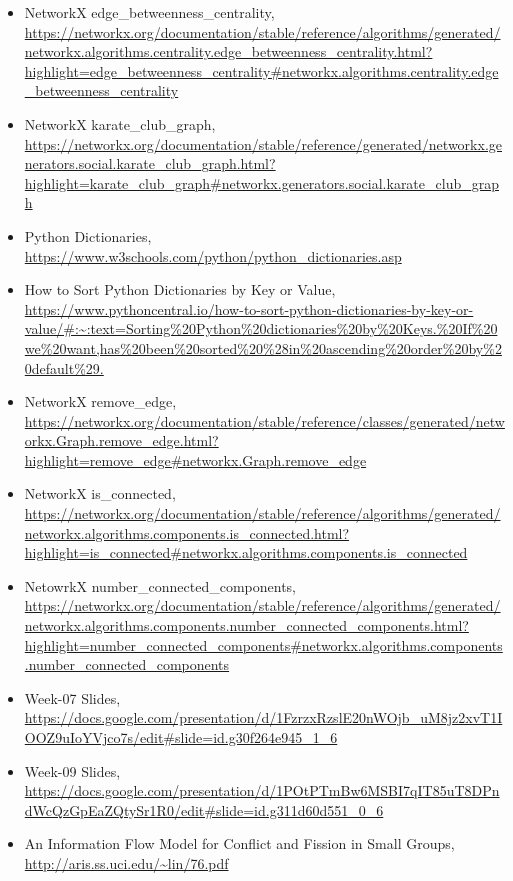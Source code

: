 \documentclass[12pt]{article}
\begin{document}
\begin{itemize}
    \item {NetworkX edge\_betweenness\_centrality, \url{https://networkx.org/documentation/stable/reference/algorithms/generated/networkx.algorithms.centrality.edge\_betweenness\_centrality.html?highlight=edge\_betweenness\_centrality#networkx.algorithms.centrality.edge\_betweenness\_centrality}}
    \item {NetworkX karate\_club\_graph, \url{https://networkx.org/documentation/stable/reference/generated/networkx.generators.social.karate\_club\_graph.html?highlight=karate\_club\_graph#networkx.generators.social.karate\_club\_graph}}
    \item {Python Dictionaries, \url{https://www.w3schools.com/python/python_dictionaries.asp}}
    \item {How to Sort Python Dictionaries by Key or Value, \url{https://www.pythoncentral.io/how-to-sort-python-dictionaries-by-key-or-value/#:~:text=Sorting\%20Python\%20dictionaries\%20by\%20Keys.\%20If\%20we\%20want,has\%20been\%20sorted\%20\%28in\%20ascending\%20order\%20by\%20default\%29.}}
    \item {NetworkX remove\_edge, \url{https://networkx.org/documentation/stable/reference/classes/generated/networkx.Graph.remove\_edge.html?highlight=remove\_edge#networkx.Graph.remove\_edge}}
    \item {NetworkX is\_connected, \url{https://networkx.org/documentation/stable/reference/algorithms/generated/networkx.algorithms.components.is\_connected.html?highlight=is\_connected#networkx.algorithms.components.is\_connected}}
    \item {NetowrkX number\_connected\_components, \url{https://networkx.org/documentation/stable/reference/algorithms/generated/networkx.algorithms.components.number\_connected\_components.html?highlight=number\_connected\_components#networkx.algorithms.components.number\_connected\_components}}
    \item {Week-07 Slides, \url{https://docs.google.com/presentation/d/1FzrzxRzslE20nWOjb_uM8jz2xvT1IOOZ9uIoYVjco7s/edit#slide=id.g30f264e945_1_6}}
    \item {Week-09 Slides, \url{https://docs.google.com/presentation/d/1POtPTmBw6MSBI7qIT85uT8DPndWcQzGpEaZQtySr1R0/edit#slide=id.g311d60d551_0_6}}
    \item {An Information Flow Model for Conflict and Fission in Small Groups, \url{http://aris.ss.uci.edu/~lin/76.pdf}}
\end{itemize}
\end{document}
